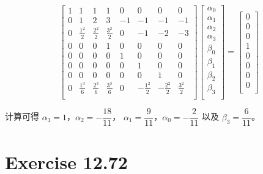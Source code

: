 \documentclass[a4paper]{article}
\begin{document}
\begin{equation}
    \begin{bmatrix}
        1 & 1 & 1 & 1 & 0 & 0 & 0 & 0\\
        0 & 1 & 2 & 3 & -1 & -1 & -1 & -1\\
        0 & \frac{1^2}{2} & \frac{2^2}{2} & \frac{3^2}{2} & 0 & -1 & -2 & -3\\
        0 & 0 & 0 & 1 & 0 & 0 & 0 & 0\\
        0 & 0 & 0 & 0 & 1 & 0 & 0 & 0\\
        0 & 0 & 0 & 0 & 0 & 1 & 0 & 0\\
        0 & 0 & 0 & 0 & 0 & 0 & 1 & 0\\
        0 & \frac{1^3}{6} & \frac{2^3}{6} & \frac{3^3}{6} & 0 & -\frac{1^2}{2} & -\frac{2^2}{2} & \frac{3^2}{2}\\
    \end{bmatrix}
    \begin{bmatrix}
        \alpha_0\\
        \alpha_1\\
        \alpha_2\\
        \alpha_3\\
        \beta_0\\
        \beta_1\\
        \beta_2\\
        \beta_3\\
    \end{bmatrix}
    =
    \begin{bmatrix}
        0\\
        0\\
        0\\
        1\\
        0\\
        0\\
        0\\
        0\\
    \end{bmatrix}
\end{equation}
\par 计算可得 $\alpha_3=1$，$\alpha_2=-\dfrac{18}{11}$，
$\alpha_1=\dfrac{9}{11}$，$\alpha_0=-\dfrac{2}{11}$
以及 $\beta_3=\dfrac{6}{11}$。

\section*{Exercise 12.72}
\end{document}
